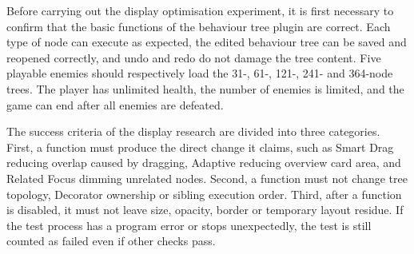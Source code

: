 Before carrying out the display optimisation experiment, it is first necessary to confirm that the basic functions of the behaviour tree plugin are correct. Each type of node can execute as expected, the edited behaviour tree can be saved and reopened correctly, and undo and redo do not damage the tree content. Five playable enemies should respectively load the 31-, 61-, 121-, 241- and 364-node trees. The player has unlimited health, the number of enemies is limited, and the game can end after all enemies are defeated.

The success criteria of the display research are divided into three categories. First, a function must produce the direct change it claims, such as Smart Drag reducing overlap caused by dragging, Adaptive reducing overview card area, and Related Focus dimming unrelated nodes. Second, a function must not change tree topology, Decorator ownership or sibling execution order. Third, after a function is disabled, it must not leave size, opacity, border or temporary layout residue. If the test process has a program error or stops unexpectedly, the test is still counted as failed even if other checks pass.
